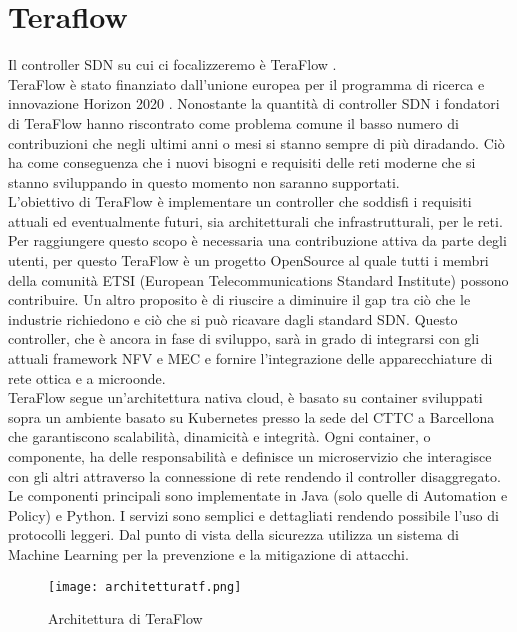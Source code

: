 \chapter{Teraflow}
Il controller SDN su cui ci focalizzeremo è TeraFlow \cite{TeraFlow}. 
\\TeraFlow è stato finanziato dall'unione europea per il programma di ricerca e innovazione Horizon 2020 \cite{Horizon}. 
Nonostante la quantità di controller SDN i fondatori di TeraFlow hanno riscontrato come problema comune il basso numero di contribuzioni che negli ultimi anni o mesi si stanno sempre di più diradando. 
Ciò ha come conseguenza che i nuovi bisogni e requisiti delle reti moderne che si stanno sviluppando in questo momento non saranno supportati.
\\L'obiettivo di TeraFlow è implementare un controller che soddisfi i requisiti attuali ed eventualmente futuri, sia architetturali che infrastrutturali, per le reti. 
Per raggiungere questo scopo è necessaria una contribuzione attiva 
da parte degli utenti, per questo TeraFlow è un progetto OpenSource 
al quale tutti i membri della comunità ETSI (European Telecommunications Standard Institute) \cite{etsi} possono contribuire. 
Un altro proposito è di riuscire a diminuire il gap tra ciò che le industrie richiedono e ciò che si può ricavare dagli standard SDN.
Questo controller, che è ancora in fase di sviluppo, sarà in grado di integrarsi con gli attuali framework NFV e MEC e fornire l'integrazione delle 
apparecchiature di rete ottica e a microonde.
\\TeraFlow segue un'architettura nativa cloud, è basato su container sviluppati sopra un ambiente basato su Kubernetes presso la sede del CTTC a Barcellona che garantiscono scalabilità, dinamicità e integrità.
Ogni container, o componente, ha delle responsabilità e definisce un microservizio che interagisce con gli altri attraverso la connessione di rete rendendo il controller disaggregato.
Le componenti principali sono implementate in Java (solo quelle di Automation e Policy) e Python.
I servizi sono semplici e dettagliati rendendo possibile l'uso di protocolli leggeri.
Dal punto di vista della sicurezza utilizza un sistema di Machine Learning per la prevenzione e la mitigazione di attacchi.
\begin{figure}[h]
    \centering
   \texttt{[image: architetturatf.png]}
    \caption{Architettura di TeraFlow}
    \label{fig:tfs}
\end{figure}

